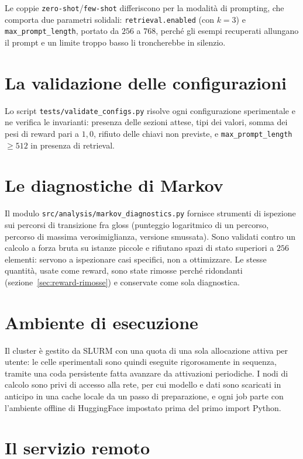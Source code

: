 Le coppie \texttt{zero-shot}/\texttt{few-shot} differiscono per la modalità di
prompting, che comporta due parametri solidali: \texttt{retrieval.enabled} (con
$k=3$) e \texttt{max\_prompt\_length}, portato da $256$ a $768$, perché gli
esempi recuperati allungano il prompt e un limite troppo basso li troncherebbe
in silenzio.

\section{La validazione delle configurazioni}

Lo script \texttt{tests/validate\_configs.py} risolve ogni configurazione
sperimentale e ne verifica le invarianti: presenza delle sezioni attese, tipi dei
valori, somma dei pesi di reward pari a $1{,}0$, rifiuto delle chiavi non
previste, e \texttt{max\_prompt\_length} $\ge 512$ in presenza di retrieval.

\section{Le diagnostiche di Markov}

Il modulo \texttt{src/analysis/markov\_diagnostics.py} fornisce strumenti di
ispezione sui percorsi di transizione fra gloss (punteggio logaritmico di un
percorso, percorso di massima verosimiglianza, versione smussata). Sono
validati contro un calcolo a forza bruta su istanze piccole e rifiutano spazi di
stato superiori a $256$ elementi: servono a ispezionare casi specifici, non a
ottimizzare. Le stesse quantità, usate come reward, sono state rimosse perché
ridondanti (sezione~\ref{sec:reward-rimosse}) e conservate come sola
diagnostica.

\section{Ambiente di esecuzione}

Il cluster è gestito da SLURM con una quota di una sola allocazione attiva per
utente: le celle sperimentali sono quindi eseguite rigorosamente in sequenza,
tramite una coda persistente fatta avanzare da attivazioni periodiche. I nodi di
calcolo sono privi di accesso alla rete, per cui modello e dati sono scaricati
in anticipo in una cache locale da un passo di preparazione, e ogni job parte con
l'ambiente offline di HuggingFace impostato prima del primo import Python.

\section{Il servizio remoto}


